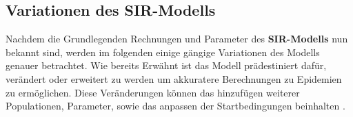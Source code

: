 \documentclass[12pt]{scrartcl} %
\begin{document}









\subsection{Variationen des SIR-Modells}

Nachdem die Grundlegenden Rechnungen und Parameter des \textbf{SIR-Modells} nun bekannt sind, werden im folgenden einige gängige Variationen des Modells genauer betrachtet. Wie bereits Erwähnt ist das Modell prädestiniert dafür, verändert oder erweitert zu werden um akkuratere Berechnungen zu Epidemien zu ermöglichen. Diese Veränderungen können das hinzufügen weiterer Populationen, Parameter, sowie das anpassen der Startbedingungen beinhalten \cite{5}.

\end{document}
